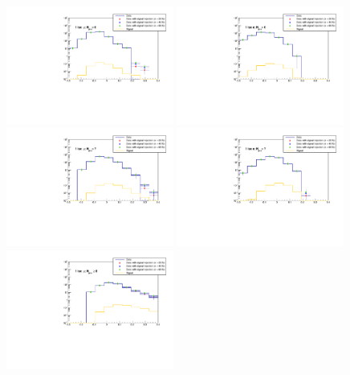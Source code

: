 \begin{figure}[ht!]
\centering
    \includegraphics[width=0.49\textwidth]{images/Run1/SignalInjection_Mu_6j.pdf}
     \includegraphics[width=0.49\textwidth]{images/Run1/SignalInjection_El_6j.pdf}
    \includegraphics[width=0.49\textwidth]{images/Run1/SignalInjection_Mu_7j.pdf}
     \includegraphics[width=0.49\textwidth]{images/Run1/SignalInjection_El_7j.pdf}
    \includegraphics[width=0.49\textwidth]{images/Run1/SignalInjection_Mu_8j.pdf}

\end{figure}
